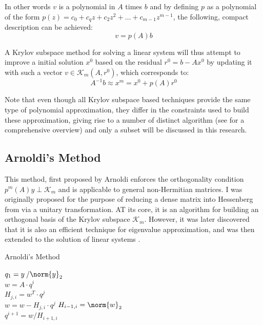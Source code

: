 \noindent In other words $v$ is a polynomial in $A$ times $b$ and by defining $p$ as a polynomial of the form $p(z) = c_0+c_qz+c_2z^2+\dots+c_{m-1}z^{m-1}$, the following, compact description can be achieved:
\begin{equation}
\label{eqn:poly2}
v=p(A)b    
\end{equation}

\noindent A Krylov subspace method for solving a linear system will thus attempt to improve a initial solution $x^0$ based on the residual $r^0 = b-Ax^0$ by updating it with such a vector $v \in \mathcal{K}_m(A, r^0)$, which corresponds to:
\begin{equation}
    A^{-1}b \approx x^m = x^0+p(A)r^0
\end{equation}

\noindent Note that even though all Krylov subspace based techniques provide the same type of polynomial approximation, they differ in the constraints used to build these approximation, giving rise to a number of distinct algorithm (see \cite{saad_iterative_2003} for a comprehensive overview) and only a subset will be discussed in this research.



\subsection{Arnoldi's Method}
\label{sec:arnoldi}
This method, first proposed by Arnoldi \cite{arnoldi_principle_1951} enforces the orthogonality condition $p^m(A)y \perp \mathcal{K}_m$ and is applicable to general non-Hermitian matrices. I was originally proposed for the purpose of reducing a dense matrix into Hessenberg from via a unitary transformation. AT its core, it is an algorithm for building an orthogonal basis of the Krylov subspace $\mathcal{K}_m$. However, it was later discovered that it is also an efficient technique for eigenvalue approximation, and was then extended to the solution of linear systems \cite{saad_iterative_2003}. 

\begin{algorithm}[h]
  \caption{Arnoldi's Method}
  \label{alg:arnoldi}
  \SetAlgoLined
  $q_1= y\:/\norm{y}_2$ \\
   {
    $w =A\cdot q^i$ \\
     {
      $H_{j,i} = w^T\cdot q^j$ \\
      $ w = w - H_{j,i}\cdot q^j$}
    $H_{i-1,i} = \norm{w}_2$ \\
    $q^{i+1} = w/H_{i+1,i}$
  }
\end{algorithm}


